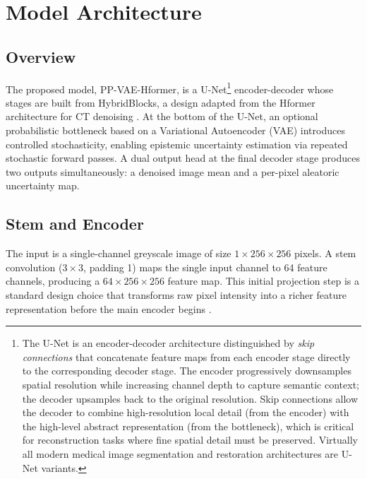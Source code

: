 \documentclass[12pt, a4paper, twoside, openright]{book}
\begin{document}
\section{Model Architecture}
\label{sec:methods:architecture}

\subsection{Overview}
\label{sec:methods:architecture:overview}

The proposed model, PP-VAE-Hformer, is a U-Net\footnote{The U-Net \cite{ronneberger_u-net_2015} is an encoder-decoder architecture distinguished by \emph{skip connections} that concatenate feature maps from each encoder stage directly to the corresponding decoder stage. The encoder progressively downsamples spatial resolution while increasing channel depth to capture semantic context; the decoder upsamples back to the original resolution. Skip connections allow the decoder to combine high-resolution local detail (from the encoder) with the high-level abstract representation (from the bottleneck), which is critical for reconstruction tasks where fine spatial detail must be preserved. Virtually all modern medical image segmentation and restoration architectures are U-Net variants.} encoder-decoder whose stages are built from HybridBlocks, a design
adapted from the Hformer architecture for CT denoising \cite{zhang_hformer_2023}. At
the bottom of the U-Net, an optional probabilistic bottleneck based on a Variational
Autoencoder (VAE) \cite{kingma_auto-encoding_2014} introduces controlled stochasticity,
enabling epistemic uncertainty estimation via repeated stochastic forward passes. A dual
output head at the final decoder stage produces two outputs simultaneously: a denoised
image mean and a per-pixel aleatoric uncertainty map.






\subsection{Stem and Encoder}
\label{sec:methods:architecture:encoder}

The input is a single-channel greyscale image of size $1 \times 256 \times 256$ pixels. A
stem convolution ($3 \times 3$, padding 1) maps the single input channel to 64 feature
channels, producing a $64 \times 256 \times 256$ feature map. This initial projection step is
a standard design choice that transforms raw pixel intensity into a richer feature
representation before the main encoder begins \cite{zhang_hformer_2023}.
\end{document}
